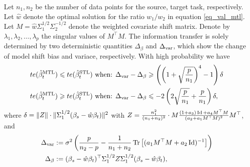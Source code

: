 \begin{theorem}\label{thm_model_shift}
	Let $n_1, n_2$ be the number of data points for the source, target task, respectively.
	Let $\hat{w}$ denote the optimal solution for the ratio $w_1/w_2$ in equation \eqref{eq_val_mtl}.
	Let ${M} = \hat{w} \Sigma_1^{1/2}\Sigma_2^{-1/2}$ denote the weighted covariate shift matrix.
	Denote by ${\lambda}_1, {\lambda}_2, \dots, {\lambda}_p$ the singular values of ${M}^{\top}{M}$.
	The information transfer is solely determined by two deterministic quantities $\Delta_{\beta}$ and $\Delta_{\text{var}}$, which show the change of model shift bias and variace, respectively.
	With high probability we have
	\begin{align}
	 	te(\hat{\beta}_{t}^{\text{MTL}}) \leqslant te(\hat{\beta}_t^{\text{STL}}) \text{ when: } &\Delta_{\text{var}} - \Delta_{\beta} \geqslant \left(\left({1 + \sqrt{\frac{p} {n_1}}}\right)^4 - 1 \right) \delta \label{upper}\\
		te(\hat{\beta}_t^{\text{MTL}}) \geqslant te(\hat{\beta}_t^{\text{STL}}) \text{ when: } &\Delta_{\text{var}} - \Delta_{\beta} \leqslant -2\left({2\sqrt{\frac {p}{n_1}} + \frac{p}{n_1}}\right) \delta, \label{lower}
	\end{align}
	where $\delta = \|Z\| \cdot \|\Sigma_1^{1/2}(\beta_s - \hat{w}\beta_t)\|^2$ with $Z = \frac{n_1^2}{(n_1 + n_2)^2}\cdot{M} \frac{(1 + a_3)\operatorname{Id} + a_4 {M}^{\top}{M}}{(a_2 + a_1 {M}^{\top}{M})^2} {M}^{\top}$, and
	\begin{align*} %
		\Delta_{\vari} &\define {\sigma^2}\bigbrace{\frac{p}{n_2 - p} -  \frac{1}{n_1 + n_2} \bigtr{(a_1 M^{\top}M + a_2\id)^{-1}} } \\
		\Delta_{\beta} &\define (\beta_s - \hat{w}\beta_t)^{\top} \Sigma_1^{1/2} Z \Sigma_1^{1/2} (\beta_s - \hat{w}\beta_t),
	\end{align*}

\end{theorem}

